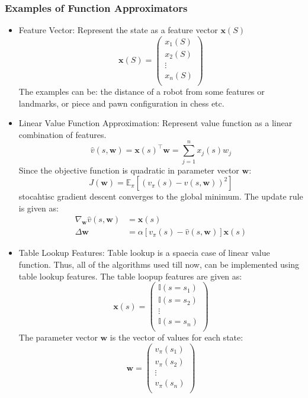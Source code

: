 \subsubsection{Examples of Function Approximators}
\begin{itemize}
    \item Feature Vector: Represent the state as a feature vector \(\mathbf{x}(S)\)
    \[
        \mathbf{x}(S) = \begin{pmatrix}
            x_1(S) \\
            x_2(S) \\
            \vdots \\
            x_n(S) \\
        \end{pmatrix}  
    \]
    The examples can be: the distance of a robot from some features or landmarks, or piece
    and pawn configuration in chess etc.
    \item Linear Value Function Approximation: Represent value function as a linear
    combination of features.
    \[
        \hat{v}(s,\mathbf{w}) = \mathbf{x}(s)^{\top}  \mathbf{w} = \sum_{j=1}^{n} x_j(s) w_j  
    \]
    Since the objective function is quadratic in parameter vector \(\mathbf{w}\):
    \[
        J(\mathbf{w}) = \mathbb{E}_{\pi}\left[ 
            \left( 
                v_{\pi}(s) - \hat{v}(s,\mathbf{w})
             \right)^{2} 
         \right]
    \]
    stocahtisc gradient descent converges to the global minimum. The update rule is given
    as:
    \[
        \begin{aligned}
            \nabla_{\mathbf{w}} \hat{v}(s,\mathbf{w}) &= \mathbf{x}(s) \\
            \Delta \mathbf{w} &= \alpha \left[ 
                v_{\pi}(s) - \hat{v}(s,\mathbf{w})
             \right] \mathbf{x}(s)
        \end{aligned}
    \]
    \item Table Lookup Features: Table lookup is a spaecia case of linear value function. Thus,
    all of the algorithms used till now, can be implemented using table lookup features.
    The table loopup features are given as:
    \[
        \mathbf{x}(s) = \begin{pmatrix}
            \mathbb{I}(s = s_1) \\
            \mathbb{I}(s = s_2) \\
            \vdots \\
            \mathbb{I}(s = s_n) \\
        \end{pmatrix}
    \]
    The parameter vector \(\mathbf{w}\) is the vector of values for each state:
    \[
        \mathbf{w} = \begin{pmatrix}
            v_{\pi}(s_1) \\
            v_{\pi}(s_2) \\
            \vdots \\
            v_{\pi}(s_n) \\
        \end{pmatrix}
    \]

\end{itemize}


